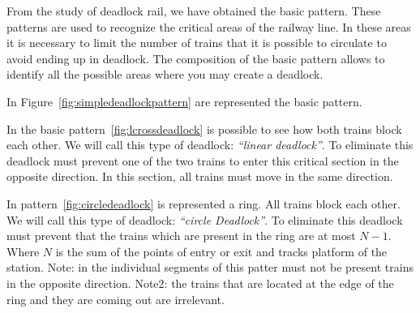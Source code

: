 \documentclass{ewic}
\begin{document}

From the study of deadlock rail, we have obtained the basic pattern.
These patterns are used to recognize the critical areas of the railway line. In these areas it is necessary to limit the number of trains that it is possible to circulate to avoid ending up in deadlock.
The composition of the basic pattern allows to identify all the possible areas where you may create a deadlock.

In Figure~\ref{fig:simpledeadlockpattern} are represented the basic pattern.


In the basic pattern~\ref{fig:lcrossdeadlock} is possible to see how both trains block each other. We will call this type of deadlock: \emph{``linear deadlock''}. To eliminate this deadlock must prevent one of the two trains to enter this critical section in the opposite direction. In this section, all trains must move in the same direction.


In pattern~\ref{fig:circledeadlock} is represented a ring. All trains block each other. We will call this type of deadlock:  \emph{``circle Deadlock''}. To eliminate this deadlock must prevent that the trains which are present in the ring are at most $N-1$. Where $N$ is the sum of the points of entry or exit and tracks platform of the station. Note: in the individual segments of this patter must not be present trains in the opposite direction. Note2: the trains that are located at the edge of the ring and they are coming out are irrelevant.
\end{document}
